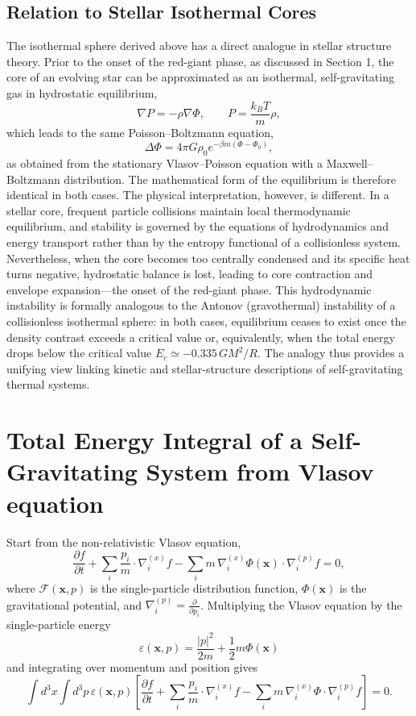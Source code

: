 \documentclass[12pt,a4paper]{article}
\numberwithin{equation}{section}
\begin{document}
\subsection*{Relation to Stellar Isothermal Cores}
The isothermal sphere derived above has a direct analogue in stellar structure theory. Prior to the onset of the red-giant phase, as discussed in Section 1, the core of an evolving star can be approximated as an isothermal, self-gravitating gas in hydrostatic equilibrium,
\[
\nabla P = -\rho \nabla \Phi, \qquad P = \frac{k_B T}{m}\rho,
\]
which leads to the same Poisson--Boltzmann equation,
\[
\Delta \Phi = 4\pi G \rho_0 e^{-\beta m(\Phi - \Phi_0)},
\]
as obtained from the stationary Vlasov--Poisson equation with a Maxwell--Boltzmann distribution. The mathematical form of the equilibrium is therefore identical in both cases.
The physical interpretation, however, is different. In a stellar core, frequent particle collisions maintain local thermodynamic equilibrium, and stability is governed by the equations of hydrodynamics and energy transport rather than by the entropy functional of a collisionless system. Nevertheless, when the core becomes too centrally condensed and its specific heat turns negative, hydrostatic balance is lost, leading to core contraction and envelope expansion—the onset of the red-giant phase. This hydrodynamic instability is formally analogous to the Antonov (gravothermal) instability of a collisionless isothermal sphere: in both cases, equilibrium ceases to exist once the density contrast exceeds a critical value or, equivalently, when the total energy drops below the critical value $E_c \simeq -0.335\, G M^2 / R$. The analogy thus provides a unifying view linking kinetic and stellar-structure descriptions of
self-gravitating thermal systems.

\section{Total Energy Integral of a Self-Gravitating System from Vlasov equation}
Start from the non-relativistic Vlasov equation,
\begin{equation}
\frac{\partial f}{\partial t} + \sum_i \frac{p_i}{m} \cdot \nabla_i^{(x)} f - \sum_i m \, \nabla_i^{(x)} \Phi(\mathbf{x}) \cdot \nabla_i^{(p)} f = 0,
\end{equation}
where $\mathcal{F}(\mathbf{x},{p})$ is the single-particle distribution function, $\Phi(\mathbf{x})$ is the gravitational potential, and $\nabla_i^{(p)} = \frac{\partial}{\partial p_i}$. Multiplying the Vlasov equation by the single-particle energy
\begin{equation}
\varepsilon(\mathbf{x},{p}) = \frac{|p|^2}{2 m} + \frac{1}{2} m \Phi(\mathbf{x})
\end{equation}
and integrating over momentum and position gives
\begin{equation}
\int d^3 x \int d^3 p \, \varepsilon(\mathbf{x},{p}) \left[ \frac{\partial f}{\partial t} + \sum_i \frac{p_i}{m} \cdot \nabla_i^{(x)} f - \sum_i m \, \nabla_i^{(x)} \Phi \cdot \nabla_i^{(p)} f \right] = 0.
\end{equation}
\end{document}
